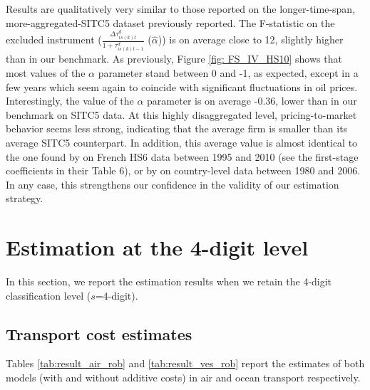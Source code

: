 \documentclass[a4paper,11pt]{article}
\begin{document}
Results are qualitatively very similar to those reported on the longer-time-span, more-aggregated-SITC5 dataset previously reported. The F-statistic on the excluded instrument ($\frac{\Delta \tau^d_{is(k)t}}{1+\tau_{is(k)t-1}^d}$ ($\widehat{\alpha}$)) is on average close to 12, slightly higher than in our benchmark. As previously, Figure \ref{fig: FS_IV_HS10} shows that most values of the $\alpha$ parameter stand between 0 and -1, as expected, except in a few years which seem again to coincide with significant fluctuations in oil prices. Interestingly, the value of the $\alpha$ parameter is on average -0.36, lower than in our benchmark on SITC5 data. At this highly disaggregated level, pricing-to-market behavior seems less strong, indicating that the average firm is smaller than its average SITC5 counterpart. In addition, this average value is almost identical to the one found by \citet{Fontagne_Martin_Orefice2018} on French HS6 data between 1995 and 2010 (see the first-stage coefficients in their Table 6), or by \citet{Bussiere2013} on country-level data between 1980 and 2006. In any case, this strengthens our confidence in the validity of our estimation strategy.

\clearpage
\setcounter{table}{0}
\setcounter{figure}{0}
\renewcommand{\thefigure}{C.\arabic{figure}}
\renewcommand{\thetable}{C.\arabic{table}}

\section{Estimation at the 4-digit level \label{app:4digit}}

In this section, we report the estimation results when we retain the 4-digit classification level ($s$=4-digit).

\subsection{Transport cost estimates}


Tables \ref{tab:result_air_rob} and \ref{tab:result_ves_rob} report the estimates of both models (with and without additive costs) in air and ocean transport respectively.
\end{document}
